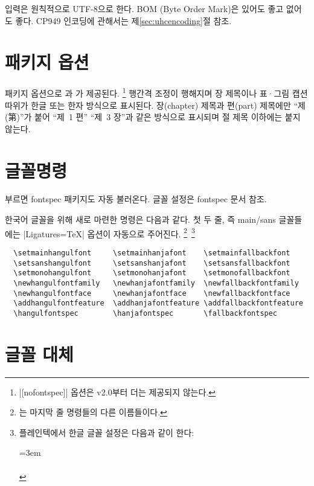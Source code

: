 \documentclass[a4paper]{article}
\def\luatex{\hologo{LuaTeX}}
\def\logoko{\textsf{k}\kern-.0625em\textit{o}}
\def\luatexko{\luatex-\logoko}
\begin{document}
입력은 원칙적으로 UTF-8으로 한다.
BOM (Byte Order Mark)은 있어도 좋고 없어도 좋다.
CP949 인코딩에 관해서는 제\ref{sec:uhcencoding}절 참조.

\section{패키지 옵션}\label{sec:packageopt}

패키지 옵션으로 과 가 제공된다.%
\footnote{%
  |[nofontspec]| 옵션은 v2.0부터 더는 제공되지 않는다. }
행간격 조정이 행해지며
장 제목이나 표·그림 캡션 따위가 한글 또는 한자 방식으로 표시된다.
장(chapter) 제목과 편(part) 제목에만 ``제(第)''가 붙어 ``제~1 편''
``제~3 장''과 같은 방식으로 표시되며 절 제목 이하에는 붙지 않는다.

\section{글꼴명령}\label{sec:fontcmds}

 부르면 fontspec 패키지도 자동 불러온다. 글꼴 설정은
fontspec 문서 참조.

한국어 글꼴을 위해 새로 마련한 명령은 다음과 같다.%
\pkgkwd*{\setmainhangulfont}%
\pkgkwd*{\setsanshangulfont}%
\pkgkwd*{\setmonohangulfont}%
\pkgkwd*{\newhangulfontfamily}%
\pkgkwd*{\newhangulfontface}%
\pkgkwd*{\addhangulfontfeature}%
\pkgkwd*{\hangulfontspec}
첫 두 줄, 즉 main/sans 글꼴들에는 |Ligatures=TeX| 옵션이 자동으로 주어진다.%
\footnote{%
    는
  마지막 줄 명령들의 다른 이름들이다. }\,%
\footnote{%
  플레인텍에서 한글 글꼴 설정은 다음과 같이 한다:\par
  \leftskip=3em\noindent
  \\
  \\
   }
\begin{verbatim}
  \setmainhangulfont     \setmainhanjafont    \setmainfallbackfont
  \setsanshangulfont     \setsanshanjafont    \setsansfallbackfont
  \setmonohangulfont     \setmonohanjafont    \setmonofallbackfont
  \newhangulfontfamily   \newhanjafontfamily  \newfallbackfontfamily
  \newhangulfontface     \newhanjafontface    \newfallbackfontface
  \addhangulfontfeature  \addhanjafontfeature \addfallbackfontfeature
  \hangulfontspec        \hanjafontspec       \fallbackfontspec
\end{verbatim}

\section{글꼴 대체}\label{sec:fontswitch}
\end{document}
